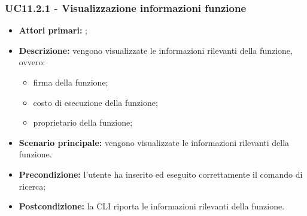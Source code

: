 \subsubsection{UC11.2.1 - Visualizzazione informazioni funzione }
\begin{itemize}
	\item \textbf{Attori primari:} \ua{};
	\item \textbf{Descrizione:} vengono visualizzate le informazioni rilevanti della funzione, ovvero:
	\begin{itemize}
		\item firma della funzione;
		\item costo di esecuzione della funzione;
		\item proprietario della funzione;
	\end{itemize}
	\item \textbf{Scenario principale:} vengono visualizzate le informazioni rilevanti della funzione. 
	\item \textbf{Precondizione:} l’utente ha inserito ed eseguito correttamente il comando di ricerca;  
	\item \textbf{Postcondizione:} la CLI riporta le informazioni rilevanti della funzione.
\end{itemize}